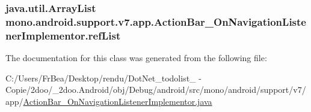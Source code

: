 \hypertarget{classmono_1_1android_1_1support_1_1v7_1_1app_1_1_action_bar___on_navigation_listener_implementor_cd717ee1cf80832735017e10eca80acf}{
\subsubsection[{refList}]{\setlength{\rightskip}{0pt plus 5cm}java.util.ArrayList {\bf mono.android.support.v7.app.ActionBar\_\-OnNavigationListenerImplementor.refList}}}
\label{classmono_1_1android_1_1support_1_1v7_1_1app_1_1_action_bar___on_navigation_listener_implementor_cd717ee1cf80832735017e10eca80acf}




The documentation for this class was generated from the following file:\begin{CompactItemize}
\item 
C:/Users/FrBea/Desktop/rendu/DotNet\_\-todolist\_ - Copie/2doo/\_\-2doo.Android/obj/Debug/android/src/mono/android/support/v7/app/\hyperlink{_action_bar___on_navigation_listener_implementor_8java}{ActionBar\_\-OnNavigationListenerImplementor.java}\end{CompactItemize}
